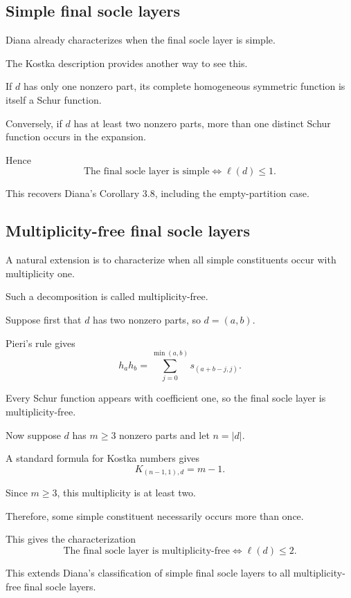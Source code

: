 \documentclass[11pt,a4paper]{article}
\begin{document}
\subsection*{Simple final socle layers}

Diana already characterizes when the
final socle layer is simple.

The Kostka description provides another
way to see this.

If $d$ has only one nonzero part, its
complete homogeneous symmetric function
is itself a Schur function.

Conversely, if $d$ has at least two
nonzero parts, more than one distinct
Schur function occurs in the expansion.

Hence
\[
\boxed{
\text{The final socle layer is simple}
\iff \ell(d)\leq1.
}
\]

This recovers Diana's Corollary 3.8,
including the empty-partition case.

\subsection*{Multiplicity-free final socle layers}

A natural extension is to characterize
when all simple constituents occur
with multiplicity one.

Such a decomposition is called
multiplicity-free.

Suppose first that $d$ has two
nonzero parts, so $d=(a,b)$.

Pieri's rule gives
\[
h_ah_b
=
\sum_{j=0}^{\min(a,b)}
s_{(a+b-j,j)}.
\]

Every Schur function appears with
coefficient one, so the final
socle layer is multiplicity-free.

Now suppose $d$ has $m\geq3$
nonzero parts and let $n=|d|$.

A standard formula for Kostka numbers gives
\[
K_{(n-1,1),d}=m-1.
\]

Since $m\geq3$, this multiplicity is
at least two.

Therefore, some simple constituent
necessarily occurs more than once.

This gives the characterization
\[
\boxed{
\text{The final socle layer is multiplicity-free}
\iff \ell(d)\leq2.
}
\]

This extends Diana's classification of
simple final socle layers to all
multiplicity-free final socle layers.
\end{document}
